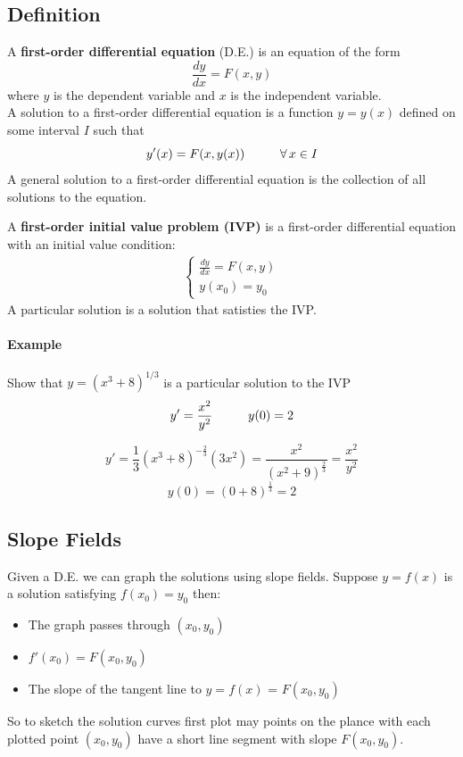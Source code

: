 \documentclass[12pt]{article}
\newcommand\tab[1][1cm]{\hspace*{#1}}
\begin{document}
\subsection{Definition}
A \textbf{first-order differential equation} (D.E.) is an equation of the form 
\[
    \frac{dy}{dx} = F(x,y)
\]
where $y$ is the dependent variable and $x$ is the independent variable. \\

\noindent
A solution to a first-order differential equation is a function $y = y(x)$ defined on some interval $I$ such that 
\[
    y'(x) = F(x, y(x)) \textrm{\tab} \forall \, x \in I
\]
A general solution to a first-order differential equation is the collection of all solutions to the equation.

\noindent 
A \textbf{first-order initial value problem (IVP)} is a first-order differential equation with an initial value condition:
\begin{align*} 
    \begin{cases} 
    \frac{dy}{dx} = F(x, y) \\
    y(x_0) = y_0
    \end{cases} 
\end{align*}
A particular solution is a solution that satisties the IVP.

\paragraph{Example} Show that $y = (x^3 + 8)^{1/3}$ is a particular solution to the IVP
\[
    y' = \frac{x^2}{y^2} \textrm{\tab} y(0) = 2
\]

\[
    y' = \frac{1}{3}(x^3 + 8)^{ - \frac{2}{3}} (3x^2) = \frac{x^2}{(x^2 + 9)^{\frac{2}{3}}} = \frac{x^2}{y^2}
\]
\[
    y(0) = (0 + 8)^\frac{1}{3} = 2
\]

\subsection{Slope Fields}
Given a D.E. we can graph the solutions using slope fields. Suppose 
$y = f(x)$ is a solution satisfying $f(x_0) = y_0$ then:
\begin{itemize} 
     \item The graph passes through $(x_0, y_0)$ 
     \item $f'(x_0) = F(x_0, y_0)$
     \item The slope of the tangent line to $y = f(x)$ = $F(x_0, y_0)$
\end{itemize}
So to sketch the solution curves first plot may points on the plance with each plotted point $(x_0, y_0)$ have a short 
line segment with slope $F(x_0, y_0)$.
\end{document}
